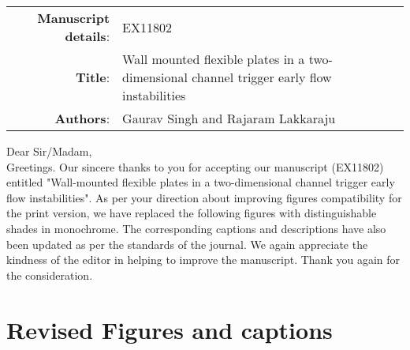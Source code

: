 \documentclass[onecolumn,a4paper,amsmath,amssym,pre]{revtex4}
\begin{document}
    

\begin{tabular}{ r | l }
  \hline            
   \textbf{Manuscript details}:& EX11802 \\	
   \textbf{Title}: & Wall mounted flexible plates in a two-dimensional channel trigger early flow instabilities\\  
  \textbf{Authors}:  & Gaurav Singh and Rajaram Lakkaraju \\
  \hline  
\end{tabular}

    
    Dear Sir/Madam, \\
    
    Greetings. 
    Our sincere thanks to you for accepting our manuscript (EX11802) entitled "Wall-mounted flexible plates in a two-dimensional channel trigger early flow instabilities". As per your direction about improving figures compatibility for the print version, we have replaced the following figures with distinguishable shades in monochrome. The corresponding captions and descriptions have also been updated as per the standards of the journal. We again appreciate the kindness of the editor in helping to improve the manuscript. Thank you again for the consideration.
    
    
    
    \section{Revised Figures and captions}
    
\end{document}
